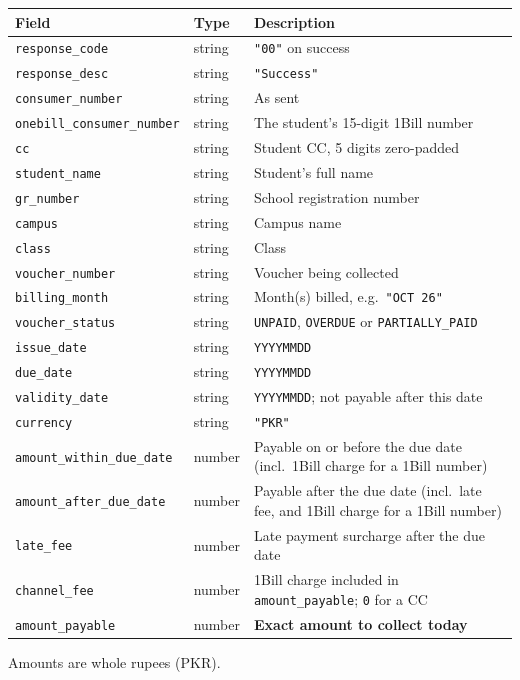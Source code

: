 \documentclass[11pt]{article}
\begin{document}
\begin{longtable}{@{}p{} p{} p{}@{}}
\toprule
\textbf{Field} & \textbf{Type} & \textbf{Description} \\
\midrule
\endhead
\texttt{response\_code} & string & \texttt{"00"} on success \\
\texttt{response\_desc} & string & \texttt{"Success"} \\
\texttt{consumer\_number} & string & As sent \\
\texttt{onebill\_consumer\_number} & string & The student's 15-digit 1Bill number \\
\texttt{cc} & string & Student CC, 5 digits zero-padded \\
\texttt{student\_name} & string & Student's full name \\
\texttt{gr\_number} & string & School registration number \\
\texttt{campus} & string & Campus name \\
\texttt{class} & string & Class \\
\texttt{voucher\_number} & string & Voucher being collected \\
\texttt{billing\_month} & string & Month(s) billed, e.g.\ \texttt{"OCT 26"} \\
\texttt{voucher\_status} & string & \texttt{UNPAID}, \texttt{OVERDUE} or \texttt{PARTIALLY\_PAID} \\
\texttt{issue\_date} & string & \texttt{YYYYMMDD} \\
\texttt{due\_date} & string & \texttt{YYYYMMDD} \\
\texttt{validity\_date} & string & \texttt{YYYYMMDD}; not payable after this date \\
\texttt{currency} & string & \texttt{"PKR"} \\
\texttt{amount\_within\_due\_date} & number & Payable on or before the due date (incl.\ 1Bill charge for a 1Bill number) \\
\texttt{amount\_after\_due\_date} & number & Payable after the due date (incl.\ late fee, and 1Bill charge for a 1Bill number) \\
\texttt{late\_fee} & number & Late payment surcharge after the due date \\
\texttt{channel\_fee} & number & 1Bill charge included in \texttt{amount\_payable}; \texttt{0} for a CC \\
\texttt{amount\_payable} & number & \textbf{Exact amount to collect today} \\
\bottomrule
\end{longtable}
Amounts are whole rupees (PKR).
\end{document}
